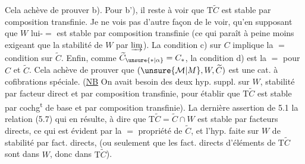 

Cela achève de prouver b). Pour b'), il reste à voir que $\mathrm T\widetilde C$ est stable par composition transfinie. Je ne vois pas d'autre façon de le voir, qu'en supposant que $W$ lui-$=$ est stable par composition transfinie (ce qui paraît à peine moins exigeant que la stabilité de $W$ par $\varinjlim$).  La condition c) sur $C$  implique la $=$ condition sur $\widetilde C$. Enfin, comme $\widetilde C_{\unsure{*|\alpha}}=C_*$, la condition d) est la $=$ pour $C$ et $\widetilde C$. Cela achève de prouver que $(\unsure{\mathcal M|M},W,\widetilde C)$ est une cat. à cofibrations spéciale. (\uline{NB} On avait besoin des  deux hyp. suppl. sur $W$, stabilité par facteur direct et par composition transfinie, pour établir que $\mathrm T\widetilde C$ est stable par cochg\textsuperscript{t} de base et par composition transfinie). La dernière assertion de 5.1  la relation (5.7) qui en résulte,  à dire que $\mathrm T\widetilde C=\widetilde C\cap W$ est stable par facteurs directs, ce qui est évident par la $=$  propriété de $\widetilde C$, et l'hyp. faite sur $W$ de  stabilité par fact. directs, (ou seulement que les fact. directs d'éléments de $\mathrm T\widetilde C$ sont dans $W$, donc dans $\mathrm T\widetilde C$).
